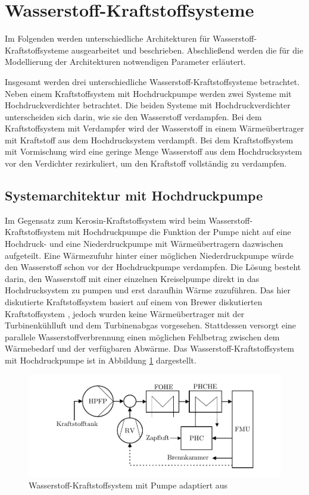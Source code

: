 \section{Wasserstoff-Kraftstoffsysteme}

Im Folgenden werden unterschiedliche Architekturen für Wasserstoff-Kraftstoffsysteme ausgearbeitet und beschrieben. Abschließend werden die für die Modellierung der Architekturen notwendigen Parameter erläutert. 

Insgesamt werden drei unterschiedliche Wasserstoff-Kraftstoffsysteme betrachtet. Neben einem Kraftstoffsystem mit Hochdruckpumpe werden zwei Systeme mit Hochdruckverdichter betrachtet. Die beiden Systeme mit Hochdruckverdichter unterscheiden sich darin, wie sie den Wasserstoff verdampfen. Bei dem Kraftstoffsystem mit Verdampfer wird der Wasserstoff in einem Wärmeübertrager mit Kraftstoff aus dem Hochdrucksystem verdampft. Bei dem Kraftstoffsystem mit Vormischung wird eine geringe Menge Wasserstoff aus dem Hochdrucksystem vor den Verdichter rezirkuliert, um den Kraftstoff vollständig zu verdampfen.

\subsection{Systemarchitektur mit Hochdruckpumpe}

Im Gegensatz zum Kerosin-Kraftstoffsystem wird beim Wasserstoff-Kraftstoffsystem mit Hochdruckpumpe die Funktion der Pumpe nicht auf eine Hochdruck- und eine Niederdruckpumpe mit Wärmeübertragern dazwischen aufgeteilt. Eine Wärmezufuhr hinter einer möglichen Niederdruckpumpe würde den Wasserstoff schon vor der Hochdruckpumpe verdampfen. Die Lösung besteht darin, den Wasserstoff mit einer einzelnen Kreiselpumpe direkt in das Hochdrucksystem zu pumpen und erst daraufhin Wärme zuzuführen. Das hier diskutierte Kraftstoffsystem basiert auf einem von Brewer diskutierten Kraftstoffsystem \cite{Brewer.1991}, jedoch wurden keine Wärmeübertrager mit der Turbinenkühlluft und dem Turbinenabgas vorgesehen. Stattdessen versorgt eine parallele Wasserstoffverbrennung einen möglichen Fehlbetrag zwischen dem Wärmebedarf und der verfügbaren Abwärme. Das Wasserstoff-Kraftstoffsystem mit Hochdruckpumpe ist in  Abbildung \ref{fig:pumpe} dargestellt.

\begin{figure}[ht]
\centering
\includegraphics[width=1\linewidth]{4_Abbildungen/2_Hauptteil/Kraftstoffsystem Abbildungen/pump.pdf}
  \caption{Wasserstoff-Kraftstoffsystem mit Pumpe adaptiert aus \cite{Brewer.1991}}
  \label{fig:pumpe}
\end{figure}
\FloatBarrier 

